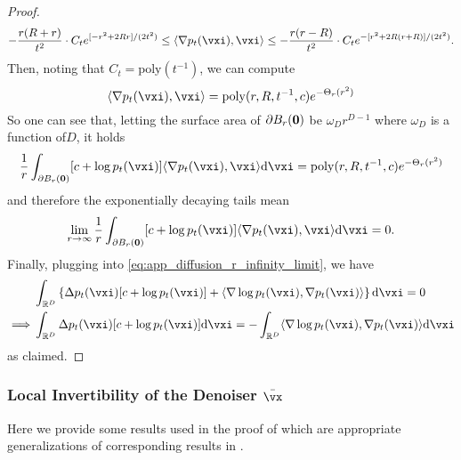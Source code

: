 \documentclass[../../book-main.tex]{subfiles}
\begin{document}
\begin{proof}
    \begin{equation}
        -\frac{r(R + r)}{t^{2}}\cdot C_{t}e^{[-r^{2} + 2Rr]/(2t^{2})} \leq \ip{\nabla p_{t}(\vxi)}{\vxi} \leq -\frac{r(r - R)}{t^{2}}\cdot C_{t}e^{-[r^{2} + 2R(r + R)]/(2t^{2})}.
    \end{equation}
    Then, noting that \(C_{t} = \mathrm{poly}(t^{-1})\), we can compute 
    \begin{equation}
        [c + \log p_{t}(\vxi)]\ip{\nabla p_{t}(\vxi)}{\vxi} = \mathrm{poly}(r, R, t^{-1}, c)e^{-\Theta_{r}(r^{2})}
    \end{equation}
    So one can see that, letting the surface area of \(\partial B_{r}(\bm{0})\) be \(\omega_{D} r^{D - 1}\) where \(\omega_{D}\) is a function of\(D\), it holds
    \begin{equation}
        \frac{1}{r}\int_{\partial B_{r}(\vzero)}[c + \log p_{t}(\vxi)]\ip{\nabla p_{t}(\vxi)}{\vxi}\odif{\vxi} = \mathrm{poly}(r, R, t^{-1}, c)e^{-\Theta_{r}(r^{2})}
    \end{equation}
    and therefore the exponentially decaying tails mean
    \begin{equation}
        \lim_{r \to \infty}\frac{1}{r}\int_{\partial B_{r}(\vzero)}[c + \log p_{t}(\vxi)]\ip{\nabla p_{t}(\vxi)}{\vxi}\odif{\vxi} = 0.
    \end{equation}
    Finally, plugging into \eqref{eq:app_diffusion_r_infinity_limit}, we have
    \begin{align}
        &\int_{\R^{D}}\bc{\Delta p_{t}(\vxi)[c + \log p_{t}(\vxi)] + \ip{\nabla \log p_{t}(\vxi)}{\nabla p_{t}(\vxi)}}\odif{\vxi} = 0 \\
        \implies 
        &\int_{\R^{D}}\Delta p_{t}(\vxi)[c + \log p_{t}(\vxi)]\odif{\vxi} = -\int_{\R^{D}}\ip{\nabla \log p_{t}(\vxi)}{\nabla p_{t}(\vxi)}\odif{\vxi}
    \end{align}
    as claimed.
\end{proof}

\subsubsection{Local Invertibility of the Denoiser \(\bar{\vx}\)}

Here we provide some results used in the proof of  which are appropriate generalizations of corresponding results in \cite{Gribonval2011-pf}.
\end{document}
